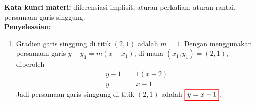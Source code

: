 \documentclass[10pt,openany,a4paper]{article}
\theoremstyle{definition}
\theoremstyle{definition}
\theoremstyle{plain}
\newenvironment{jawab}[2][tes]{%
\par\noindent\textbf{Kata kunci materi:} #1.\\
\textbf{Penyelesaian:} #2%
}{}
\begin{document}
\begin{enumerate}
\begin{jawab}[diferensiasi implisit, aturan perkalian, aturan rantai, persamaan garis singgung]
{\begin{enumerate}
            \item Gradien garis singgung di titik $(2,1)$ adalah $m=1$. Dengan menggunakan persamaan garis $y - y_1 = m(x - x_1)$, di mana $(x_1,y_1)=(2,1)$, diperoleh
            \begin{align*}
                y - 1 &= 1(x - 2)\\
                y &= x - 1.
            \end{align*}
            Jadi persamaan garis singgung di titik $(2,1)$ adalah $\colorlet{oldcolor}{.}
        \color{red}
        \setlength{\fboxrule}{1pt} \boxed{\color{oldcolor}y = x - 1}\color{oldcolor}$.
        \end{enumerate}
    }
    \end{jawab}
\end{enumerate}

\newpage
\end{document}
